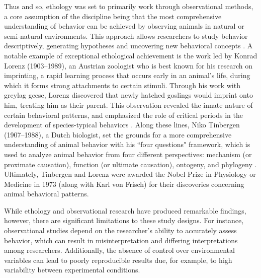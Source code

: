 Thus and so, ethology was set to primarily work through observational methods, a core assumption of the discipline being that the most comprehensive understanding of behavior can be achieved by observing animals in natural or semi-natural environments. This approach allows researchers to study behavior descriptively, generating hypotheses and uncovering new behavioral concepts \cite{Marler2005EthologyEndocrinology}. A notable example of exceptional ethological achievement is the work led by Konrad Lorenz (1903--1989), an Austrian zoologist who is best known for his research on imprinting, a rapid learning process that occurs early in an animal's life, during which it forms strong attachments to certain stimuli. Through his work with greylag geese, Lorenz discovered that newly hatched goslings would imprint onto him, treating him as their parent. This observation revealed the innate nature of certain behavioral patterns, and emphasized the role of critical periods in the development of species-typical behaviors \cite{Sulloway1982DarwinLegend}. Along these lines, Niko Tinbergen (1907--1988), a Dutch biologist, set the grounds for a more comprehensive understanding of animal behavior with his ``four questions" framework, which is used to analyze animal behavior from four different perspectives: mechanism (or proximate causation), function (or ultimate causation), ontogeny, and phylogeny \cite{Burkhardt2016NikoArchives}. Ultimately, Tinbergen and Lorenz were awarded the Nobel Prize in Physiology or Medicine in 1973 (along with Karl von Frisch) for their discoveries concerning animal behavioral patterns.

While ethology and observational research have produced remarkable findings, however, there are significant limitations to these study designs. For instance, observational studies depend on the researcher's ability to accurately assess behavior, which can result in misinterpretation and differing interpretations among researchers. Additionally, the absence of control over environmental variables can lead to poorly reproducible results due, for example, to high variability between experimental conditions.

